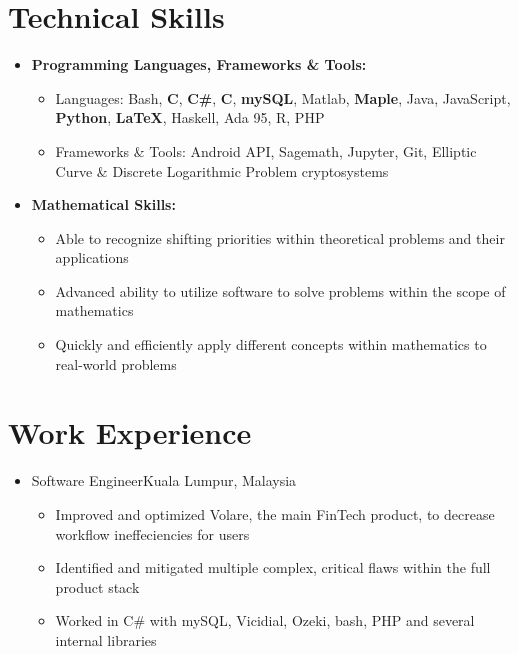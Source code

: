 \documentclass[10pt,letterpaper,sans]{moderncv}
\renewcommand{\_}{\textscale{.7}{\textunderscore}}
\newcommand{\Rplus}{\protect\hspace{-.1em}\protect\raisebox{.35ex}{\smaller{\smaller\textbf{+}}}}
\newcommand{\Cpp}{\mbox{C\Rplus\Rplus}\xspace}
\begin{document}
\section{Technical Skills}
\vspace{0.75em}
\begin{itemize}
\item \textbf{Programming Languages, Frameworks \& Tools:}
\begin{itemize}
    \item {Languages:} Bash, \textbf{C}, \textbf{C\#}, \textbf{\Cpp}, \textbf{mySQL}, Matlab, \textbf{Maple}, Java, JavaScript, \textbf{Python}, \textbf{\LaTeX}, Haskell, Ada 95, R, PHP
    \item {Frameworks \& Tools:} Android API, Sagemath, Jupyter, Git, Elliptic Curve \& Discrete Logarithmic Problem cryptosystems
\end{itemize}
\vspace{0.5em}
\item \textbf{Mathematical Skills:}
\begin{itemize}
    \item Able to recognize shifting priorities within theoretical problems and their applications
    \item Advanced ability to utilize software to solve problems within the scope of mathematics
    \item Quickly and efficiently apply different concepts within mathematics to real-world problems
\end{itemize}
\end{itemize}
\vspace{0.5em}

\section{Work Experience}
\vspace{0.75em}
\begin{itemize}
\item{
  {Software Engineer}{Kuala Lumpur, Malaysia}{}{
    \begin{itemize}
    \item Improved and optimized Volare, the main FinTech product, to decrease workflow ineffeciencies for users
    \item Identified and mitigated multiple complex, critical flaws within the full product stack
    \item Worked in C\# with mySQL, Vicidial, Ozeki, bash, PHP and several internal libraries
    \end{itemize}
}}
\end{itemize}
\end{document}
